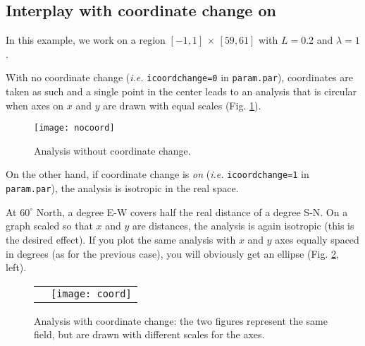 



\subsection{Interplay with coordinate change on}

In this example, we work on a region $[-1,1]\, \times\, [59,61]$ with $L=0.2$ and $\lambda=1$.
 

With no coordinate change (\textit{i.e.} \texttt{icoordchange=0} in \texttt{param.par}), coordinates are taken as such and
a single point in the center leads to an analysis that is circular when axes on $x$ and $y$ are drawn with equal scales (Fig. \ref{fig:nocoord}).

\begin{figure}[H]
\centering
\texttt{[image: nocoord]}
\caption{Analysis without coordinate change.\label{fig:nocoord}}
\end{figure}


On the other hand, if coordinate change is \textsl{on} (\textit{i.e.} \texttt{icoordchange=1} in \texttt{param.par}), the analysis is isotropic in the real space.

At $60^{\circ}$ North, a degree E-W covers half the real distance of a degree S-N. On a graph scaled so that $x$ and $y$ are distances, the analysis is again isotropic (this is the desired effect). If you plot the same analysis with $x$ and $y$ axes equally spaced in degrees (as for the previous case), you will obviously get an ellipse (Fig. \ref{fig:coord}, left).

\begin{figure}[H]
\centering
\begin{tabular}{cc}
\raisebox{.2\textwidth}{\texttt{[image: coord]}}& \texttt{[image: coord]}\\
\end{tabular}
\caption[Analysis with coordinate change.]{Analysis with coordinate change: the two figures represent the same field, but are drawn with different scales for the axes.\label{fig:coord}}
\end{figure}


